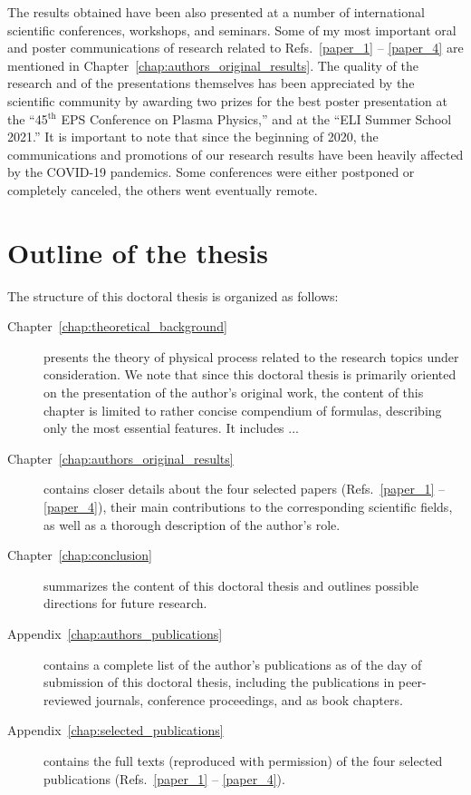 \documentclass[10pt, a4paper, twoside, openright]{report}
\newcommand{\q}[1]{``#1''} %
\begin{document}
The results obtained have been also presented at a number of international scientific conferences, workshops, and seminars. Some of my most important oral and poster communications of research related to Refs.~\ref{paper_1} -- \ref{paper_4} are mentioned in Chapter~\ref{chap:authors_original_results}. The quality of the research and of the presentations themselves has been appreciated by the scientific community by awarding two prizes for the best poster presentation at the \q{45$ ^{\mathrm{th}} $ EPS Conference on Plasma Physics,} and at the \q{ELI Summer School 2021.} It is important to note that since the beginning of 2020, the communications and promotions of our research results have been heavily affected by the COVID-19 pandemics. Some conferences were either postponed or completely canceled, the others went eventually remote.

\section{Outline of the thesis}
%

The structure of this doctoral thesis is organized as follows: 

\begin{description}
	\item[Chapter~\ref{chap:theoretical_background}] presents the theory of physical process related to the research topics under consideration. We note that since this doctoral thesis is primarily oriented on the presentation of the author's original work, the content of this chapter is limited to rather concise compendium of formulas, describing only the most essential features. It includes ... 
	
	\item[Chapter~\ref{chap:authors_original_results}] contains closer details about the four selected papers (Refs.~\ref{paper_1} -- \ref{paper_4}), their main contributions to the corresponding scientific fields, as well as a thorough description of the author's role. 
	
	\item[Chapter~\ref{chap:conclusion}] summarizes the content of this doctoral thesis and outlines possible directions for future research. 
	
	
	\item[Appendix~\ref{chap:authors_publications}] contains a complete list of the author's publications as of the day of submission of this doctoral thesis, including the publications in peer-reviewed journals, conference proceedings, and as book chapters.
	
	\item[Appendix~\ref{chap:selected_publications}] contains the full texts (reproduced with permission) of the four selected publications (Refs.~\ref{paper_1} -- \ref{paper_4}).
\end{description}
\end{document}
